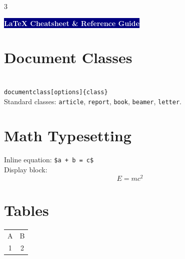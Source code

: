 \documentclass[10pt,landscape,a4paper]{article}
\begin{document}
\begin{multicols*}{3}
\begin{center}
    \colorbox{navy}{\textcolor{white}{\bfseries \large LaTeX Cheatsheet \& Reference Guide}}
\end{center}

\section*{Document Classes}
\texttt{\\documentclass[options]\{class\}} \\
Standard classes: \texttt{article}, \texttt{report}, \texttt{book}, \texttt{beamer}, \texttt{letter}.

\section*{Math Typesetting}
Inline equation: \texttt{\$a + b = c\$} \\
Display block:
\begin{equation*}
  E = mc^2
\end{equation*}

\columnbreak

\section*{Tables}
\begin{tabular}{cc}
  A & B \\
  1 & 2
\end{tabular}
\end{multicols*}
\end{document}
